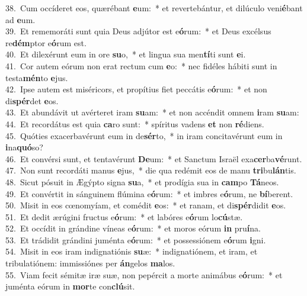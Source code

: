 {38.~}Cum occíderet eos, quærébant \textbf{e}um:~* et revertebántur, et dilúculo veni\textbf{é}bant ad \textbf{e}um.\\
{39.~}Et rememoráti sunt quia Deus adjútor est e\textbf{ó}rum:~* et Deus excélsus re\textbf{dém}ptor e\textbf{ó}rum est.\\
{40.~}Et dilexérunt eum in ore \textbf{su}o,~* et lingua sua men\textbf{tí}ti sunt \textbf{e}i.\\
{41.~}Cor autem eórum non erat rectum cum \textbf{e}o:~* nec fidéles hábiti sunt in testa\textbf{mén}to \textbf{e}jus.\\
{42.~}Ipse autem est miséricors, et propítius fiet peccátis e\textbf{ó}rum:~* et non di\textbf{spér}det \textbf{e}os.\\
{43.~}Et abundávit ut avérteret iram \textbf{su}am:~* et non accéndit omnem \textbf{i}ram \textbf{su}am:\\
{44.~}Et recordátus est quia \textbf{ca}ro sunt:~* spíritus vadens \textbf{et} non \textbf{ré}diens.\\
{45.~}Quóties exacerbavérunt eum in de\textbf{sér}to,~* in iram concitavérunt eum in \textbf{i}na\textbf{quó}so?\\
{46.~}Et convérsi sunt, et tentavérunt \textbf{De}um:~* et Sanctum Israël exa\textbf{cer}ba\textbf{vé}runt.\\
{47.~}Non sunt recordáti manus \textbf{e}jus,~* die qua redémit eos de manu \textbf{tri}bu\textbf{lán}tis.\\
{48.~}Sicut pósuit in Ægýpto signa \textbf{su}a,~* et prodígia sua in \textbf{cam}po \textbf{Tá}neos.\\
{49.~}Et convértit in sánguinem flúmina e\textbf{ó}rum:~* et imbres e\textbf{ó}rum, ne \textbf{bí}berent.\\
{50.~}Misit in eos cœnomyíam, et comédit \textbf{e}os:~* et ranam, et di\textbf{spér}didit \textbf{e}os.\\
{51.~}Et dedit ærúgini fructus e\textbf{ó}rum:~* et labóres e\textbf{ó}rum lo\textbf{cú}stæ.\\
{52.~}Et occídit in grándine víneas e\textbf{ó}rum:~* et moros eórum \textbf{in} pru\textbf{í}na.\\
{53.~}Et trádidit grándini juménta e\textbf{ó}rum:~* et possessiónem e\textbf{ó}rum \textbf{i}gni.\\
{54.~}Misit in eos iram indignatiónis \textbf{su}æ:~* indignatiónem, et iram, et tribulatiónem: immissiónes per \textbf{án}gelos \textbf{ma}los.\\
{55.~}Viam fecit sémitæ iræ suæ, non pepércit a morte animábus e\textbf{ó}rum:~* et juménta eórum in \textbf{mor}te con\textbf{clú}sit.\\
